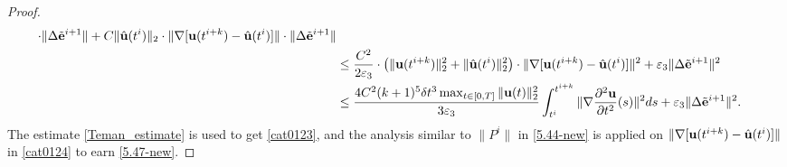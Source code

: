 \documentclass{article}
\theoremstyle{definition}                   %
\begin{document}
\begin{proof}
\begin{align}
\cdot \| \Delta \tilde{\bf e}^{i+1} \|
+
C \|\hat{\bf u}(t^{i})\|_2 \cdot 
\| \nabla[ {\bf u}(t^{i+k}) - \hat{\bf{u}}(t^i)] \|
\cdot \| \Delta \tilde{\bf e}^{i+1} \|
\label{cat0123}
\\
&\le 
\frac{C^2}{2\varepsilon_3} 
\cdot  \left( \|{\bf u}(t^{i+k})\|_2^2
+ \|\hat{\bf u}(t^{i})\|_2^2 \right) \cdot
\| \nabla[ {\bf u}(t^{i+k}) - \hat{\bf{u}}(t^i)] \|^2
+ \varepsilon_3 \| \Delta \tilde{\bf e}^{i+1} \|^2
\label{cat0124}
\\
&\le 
\frac{4C^2 (k+1)^5 \delta t^3 \max_{t\in [0,T]} \|{\bf u}(t)\|_2^2} {3\varepsilon_3} 
\int_{t^i}^{t^{i+k}} \|\nabla \frac{\partial^2 {\bf u}}{\partial t^2}(s)\|^2 ds 
+ \varepsilon_3 \| \Delta \tilde{\bf e}^{i+1} \|^2
.
\label{5.47-new}
\end{align}
The estimate \eqref{Teman_estimate} is used to get \eqref{cat0123}, and the analysis similar to $\|P^i\|$ in \eqref{5.44-new} is applied on 
$\| \nabla[ {\bf u}(t^{i+k}) - \hat{\bf{u}}(t^i)] \|$ in \eqref{cat0124} to earn \eqref{5.47-new}.



\end{proof}
\end{document}
